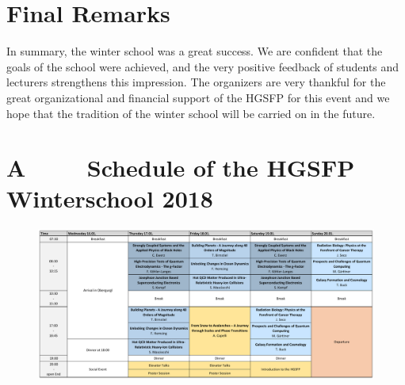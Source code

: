 \newpage







\section*{Final Remarks}
In summary, the winter school was a great success. We are confident that the goals of the school were achieved, and the very positive feedback of students and lecturers strengthens this impression. The organizers are very thankful for the great organizational and financial support of the HGSFP for this event and we hope that the tradition of the winter school will be carried on in the future.




\newpage
\appendix
\section*{A $\qquad$ Schedule of the HGSFP Winterschool 2018}

\begin{figure}[h!]
\centering
\includegraphics[scale=0.66, angle = 90 ]{figures/Program.jpg}
\end{figure}

\newpage